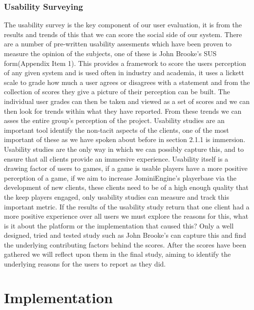 \documentclass{article}
\begin{document}
	\subsubsection{Usability Surveying}
	The usability survey is the key component of our user evaluation, it is from the results and trends of this that we can score the social side of our system. There are a number of pre-written usability assesments which have been proven to measure the opinion of the subjects, one of these is John Brooke's SUS form\cite{Brooke96sus:a}(Appendix Item 1). This provides a framework to score the users perception of any given system and is used often in industry and academia, it uses a lickett scale to grade how much a user agrees or disagrees with a statement and from the collection of scores they give a picture of their perception can be built. The individual user grades can then be taken and viewed as a set of scores and we can then look for trends within what they have reported. From these trends we can asses the entire group's perception of the project. Usability studies are an important tool identify the non-tacit aspects of the clients, one of the most important of these as we have spoken about before in section 2.1.1 is immersion. Usability studies are the only way in which we can possibly capture this, and to ensure that all clients provide an immersive experience. Usability itself is a drawing factor of users to games, if a game is usable players have a more positive perception of a game\cite{Christou:2012:EPP:2367616.2367630}, if we aim to increase JominiEngine's playerbase via the development of new clients, these clients need to be of a high enough quality that the keep players engaged, only usability studies can measure and track this important metric. If the results of the usability study return that one client had a more positive experience over all users we must explore the reasons for this, what is it about the platform or the implementation that caused this? Only a well designed, tried and tested study such as John Brooke's can capture this and find the underlying contributing factors behind the scores. After the scores have been gathered we will reflect upon them in the final study, aiming to identify the underlying reasons for the users to report as they did.
\section{Implementation}
\end{document}
